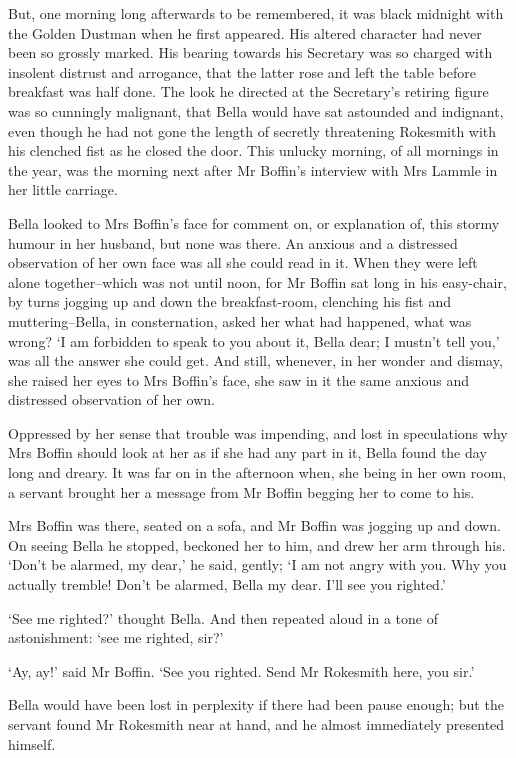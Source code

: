 But, one morning long afterwards to be remembered, it was black midnight
with the Golden Dustman when he first appeared. His altered character
had never been so grossly marked. His bearing towards his Secretary was
so charged with insolent distrust and arrogance, that the latter rose
and left the table before breakfast was half done. The look he directed
at the Secretary’s retiring figure was so cunningly malignant, that
Bella would have sat astounded and indignant, even though he had not
gone the length of secretly threatening Rokesmith with his clenched
fist as he closed the door. This unlucky morning, of all mornings in the
year, was the morning next after Mr Boffin’s interview with Mrs Lammle
in her little carriage.

Bella looked to Mrs Boffin’s face for comment on, or explanation of,
this stormy humour in her husband, but none was there. An anxious and
a distressed observation of her own face was all she could read in it.
When they were left alone together--which was not until noon, for Mr
Boffin sat long in his easy-chair, by turns jogging up and down
the breakfast-room, clenching his fist and muttering--Bella, in
consternation, asked her what had happened, what was wrong? ‘I am
forbidden to speak to you about it, Bella dear; I mustn’t tell you,’
was all the answer she could get. And still, whenever, in her wonder and
dismay, she raised her eyes to Mrs Boffin’s face, she saw in it the same
anxious and distressed observation of her own.

Oppressed by her sense that trouble was impending, and lost in
speculations why Mrs Boffin should look at her as if she had any part in
it, Bella found the day long and dreary. It was far on in the afternoon
when, she being in her own room, a servant brought her a message from Mr
Boffin begging her to come to his.

Mrs Boffin was there, seated on a sofa, and Mr Boffin was jogging up and
down. On seeing Bella he stopped, beckoned her to him, and drew her arm
through his. ‘Don’t be alarmed, my dear,’ he said, gently; ‘I am not
angry with you. Why you actually tremble! Don’t be alarmed, Bella my
dear. I’ll see you righted.’

‘See me righted?’ thought Bella. And then repeated aloud in a tone of
astonishment: ‘see me righted, sir?’

‘Ay, ay!’ said Mr Boffin. ‘See you righted. Send Mr Rokesmith here, you
sir.’

Bella would have been lost in perplexity if there had been pause
enough; but the servant found Mr Rokesmith near at hand, and he almost
immediately presented himself.

